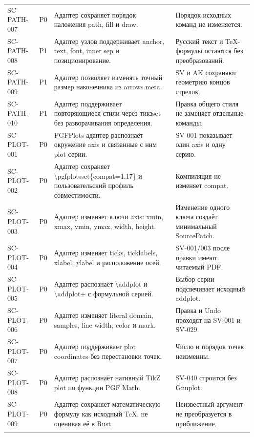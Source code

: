 \documentclass[11pt,a4paper,oneside]{scrreprt}
\begin{document}
\begin{longtable}{@{}>{\raggedright\arraybackslash}p{2.35cm}>{\raggedright\arraybackslash}p{0.75cm}>{\raggedright\arraybackslash}p{6.35cm}>{\raggedright\arraybackslash}p{5.2cm}@{}}
\footnotesize SC-PATH-007 & P0 & Адаптер сохраняет порядок наложения path, fill и draw. & Порядок исходных команд не изменяется. \\ \addlinespace[2pt]
\footnotesize SC-PATH-008 & P1 & Адаптер узлов поддерживает anchor, text, font, inner sep и позиционирование. & Русский текст и TeX-формулы остаются без преобразований. \\ \addlinespace[2pt]
\footnotesize SC-PATH-009 & P1 & Адаптер позволяет изменять точный размер наконечника из arrows.meta. & SV и AK сохраняют геометрию концов стрелок. \\ \addlinespace[2pt]
\footnotesize SC-PATH-010 & P1 & Адаптер поддерживает повторяющиеся стили через тикзset без разворачивания определения. & Правка общего стиля не заменяет отдельные команды. \\ \addlinespace[2pt]
\footnotesize SC-PLOT-001 & P0 & PGFPlots-адаптер распознаёт окружение axis и связанные с ним plot серии. & SV-001 показывает один axis и одну серию. \\ \addlinespace[2pt]
\footnotesize SC-PLOT-002 & P0 & Адаптер сохраняет \textbackslash{}pgfplotsset\{compat=1.17\} и пользовательский профиль совместимости. & Компиляция не изменяет compat. \\ \addlinespace[2pt]
\footnotesize SC-PLOT-003 & P0 & Адаптер изменяет ключи axis: xmin, xmax, ymin, ymax, width, height. & Изменение одного ключа создаёт минимальный SourcePatch. \\ \addlinespace[2pt]
\footnotesize SC-PLOT-004 & P0 & Адаптер изменяет ticks, ticklabels, xlabel, ylabel и расположение осей. & SV-001/003 после правки имеют читаемый PDF. \\ \addlinespace[2pt]
\footnotesize SC-PLOT-005 & P0 & Адаптер распознаёт \textbackslash{}addplot и \textbackslash{}addplot+ с формульной серией. & Выбор серии подсвечивает исходный addplot. \\ \addlinespace[2pt]
\footnotesize SC-PLOT-006 & P0 & Адаптер изменяет literal domain, samples, line width, color и mark. & Правка и Undo проходят на SV-001 и SV-029. \\ \addlinespace[2pt]
\footnotesize SC-PLOT-007 & P0 & Адаптер поддерживает plot coordinates без перестановки точек. & Число и порядок точек неизменны. \\ \addlinespace[2pt]
\footnotesize SC-PLOT-008 & P0 & Адаптер распознаёт нативный TikZ plot по функции PGF Math. & SV-040 строится без Gnuplot. \\ \addlinespace[2pt]
\footnotesize SC-PLOT-009 & P0 & Адаптер сохраняет математическую формулу как исходный TeX, не оценивая её в Rust. & Неизвестный аргумент не преобразуется в приближение. \\ \addlinespace[2pt]

\end{longtable}
\end{document}
